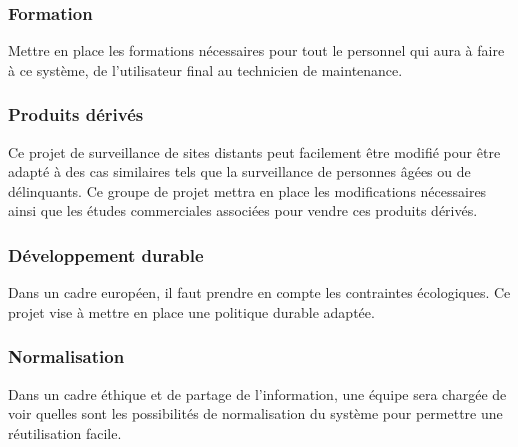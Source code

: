 \documentclass[a4paper, 11pt, draft]{report}
\begin{document}
\subsubsection{Formation}

Mettre en place les formations nécessaires pour tout le personnel qui aura à faire à ce système, de l'utilisateur final au technicien de maintenance.


\subsubsection{Produits dérivés}

Ce projet de surveillance de sites distants peut facilement être modifié pour être adapté à des cas similaires tels que la surveillance de personnes âgées ou de délinquants. Ce groupe de projet mettra en place les modifications nécessaires ainsi que les études commerciales associées pour vendre ces produits dérivés.


\subsubsection{Développement durable}

Dans un cadre européen, il faut prendre en compte les contraintes écologiques. Ce projet vise à mettre en place une politique durable adaptée.

\subsubsection{Normalisation}

Dans un cadre éthique et de partage de l'information, une équipe sera chargée de voir quelles sont les possibilités de normalisation du système pour permettre une réutilisation facile.
\end{document}

